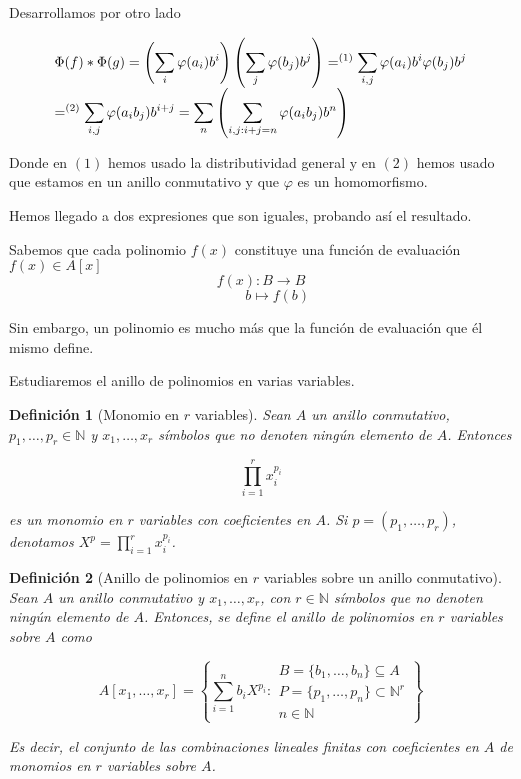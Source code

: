 \documentclass[11pt, a4paper, titlepage]{article}
\makeatletter
\renewenvironment{proof}[1][\proofname] {\vspace{-15pt}\par\pushQED{\qed}\normalfont\topsep6\p@\@plus6\p@\relax\trivlist\item[\hskip\labelsep\it#1\@addpunct{.}]\ignorespaces}{\popQED\endtrivlist\@endpefalse}
\theoremstyle{theorem-style}
\theoremstyle{definition-style}
\newtheorem*{ndef}{Definición}
\theoremstyle{remark-style}
\theoremstyle{example-style}
\makeatother
\begin{document}
\begin{proof}
 Desarrollamos por otro lado
 
 \[
 \begin{array}{>{\displaystyle}l}
   \Phi(f) * \Phi(g) = \left(\sum_i \varphi(a_i)b^i\right)\left(\sum_j \varphi(b_j)b^j\right) =^{(1)} \sum_{i,j} \varphi(a_i)b^i\varphi(b_j)b^j \\
   =^{(2)} \sum_{i,j} \varphi(a_ib_j)b^{i+j} = \sum_n\left(\sum_{i,j: i+j = n} \varphi(a_ib_j)b^n\right)
 \end{array}
 \]
 
 Donde en $(1)$ hemos usado la distributividad general y en $(2)$ hemos usado que estamos en un anillo conmutativo y que $\varphi$ es un homomorfismo. 
 
 Hemos llegado a dos expresiones que son iguales, probando así el resultado.
 
\end{proof}


Sabemos que cada polinomio $f(x)$ constituye una función de evaluación $f(x) \in A[x]$
\[
f(x):B \to B
\]
\[
\hspace{1cm}b \mapsto f(b)
\]

Sin embargo, un polinomio es mucho más que la función de evaluación que él mismo define.

Estudiaremos el anillo de polinomios en varias variables.

\begin{ndef}[Monomio en $r$ variables]
  Sean $A$ un anillo conmutativo, $p_1, \dots, p_r \in \mathbb{N}$ y $x_1, \dots, x_r$ símbolos que no denoten ningún elemento de $A$.
  Entonces

  \[
      \prod_{i=1}^r x_i^{p_i}
  \]

  es un monomio en $r$ variables con coeficientes en $A$. Si $p = (p_1, \dots, p_r)$, denotamos $X^p = \prod_{i=1}^r x_i^{p_i}$.
\end{ndef}

\begin{ndef}[Anillo de polinomios en $r$ variables sobre un anillo conmutativo]
  Sean $A$ un anillo conmutativo y $x_1, \dots, x_r$, con $r \in \mathbb{N}$ símbolos que no denoten ningún elemento de $A$. Entonces, se define el anillo de polinomios en
  $r$ variables sobre $A$ como

  \[
      A[x_1, \dots, x_r] = \left\{ \sum_{i=1}^n b_iX^{p_i} : 
      \begin{array}{l}
        B = \{b_1, \dots, b_n\} \subseteq A \\
        P = \{p_1, \dots, p_n\} \subset \mathbb{N}^r \\
        n \in \mathbb{N}
      \end{array} \right\}
   \]

      Es decir, el conjunto de las combinaciones lineales finitas con coeficientes en $A$ de monomios en $r$ variables sobre $A$.
\end{ndef}
\end{document}
